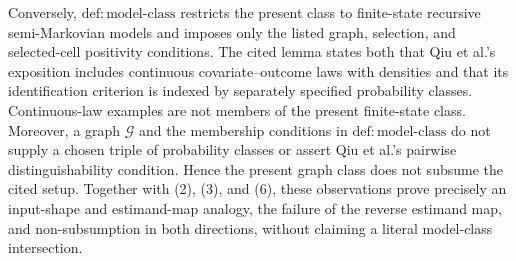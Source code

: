 Conversely, \(\mathrm{def{:}model\text{-}class}\) restricts the present class to finite-state recursive semi-Markovian models and imposes only the listed graph, selection, and selected-cell positivity conditions. The cited lemma states both that Qiu et al.'s exposition includes continuous covariate--outcome laws with densities and that its identification criterion is indexed by separately specified probability classes. Continuous-law examples are not members of the present finite-state class. Moreover, a graph \(\mathcal G\) and the membership conditions in \(\mathrm{def{:}model\text{-}class}\) do not supply a chosen triple of probability classes or assert Qiu et al.'s pairwise distinguishability condition. Hence the present graph class does not subsume the cited setup. Together with (2), (3), and (6), these observations prove precisely an input-shape and estimand-map analogy, the failure of the reverse estimand map, and non-subsumption in both directions, without claiming a literal model-class intersection.